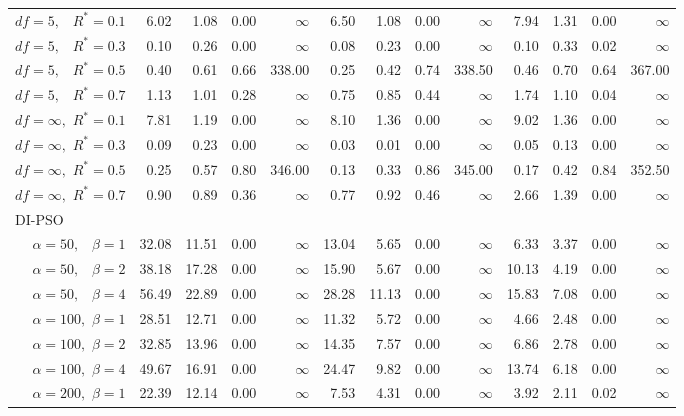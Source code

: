 \documentclass[12pt]{article}
\begin{document}
\begin{table}[ht]
{\begin{tabular}{r|rrrr|rrrr|rrrr}
  $df = 5,\enspace$ $R^* =0.1$ & 6.02 & 1.08 & 0.00 & $\infty$ & 6.50 & 1.08 & 0.00 & $\infty$ & 7.94 & 1.31 & 0.00 & $\infty$ \\ 
  $df = 5,\enspace$ $R^* =0.3$ & 0.10 & 0.26 & 0.00 & $\infty$ & 0.08 & 0.23 & 0.00 & $\infty$ & 0.10 & 0.33 & 0.02 & $\infty$ \\ 
  $df = 5,\enspace$ $R^* =0.5$ & 0.40 & 0.61 & 0.66 & 338.00 & 0.25 & 0.42 & 0.74 & 338.50 & 0.46 & 0.70 & 0.64 & 367.00 \\ 
  $df = 5,\enspace$ $R^* =0.7$ & 1.13 & 1.01 & 0.28 & $\infty$ & 0.75 & 0.85 & 0.44 & $\infty$ & 1.74 & 1.10 & 0.04 & $\infty$ \\ 
  $df = \infty,$ $R^* =0.1$ & 7.81 & 1.19 & 0.00 & $\infty$ & 8.10 & 1.36 & 0.00 & $\infty$ & 9.02 & 1.36 & 0.00 & $\infty$ \\ 
  $df = \infty,$ $R^* =0.3$ & 0.09 & 0.23 & 0.00 & $\infty$ & 0.03 & 0.01 & 0.00 & $\infty$ & 0.05 & 0.13 & 0.00 & $\infty$ \\ 
  $df = \infty,$ $R^* =0.5$ & 0.25 & 0.57 & 0.80 & 346.00 & 0.13 & 0.33 & 0.86 & 345.00 & 0.17 & 0.42 & 0.84 & 352.50 \\ 
  $df = \infty,$ $R^* =0.7$ & 0.90 & 0.89 & 0.36 & $\infty$ & 0.77 & 0.92 & 0.46 & $\infty$ & 2.66 & 1.39 & 0.00 & $\infty$ \\ 
\hline
\multicolumn{1}{l|}{DI-PSO} &&&&&&&&&&&&\\
  $\alpha = 50,\enspace$ $\beta =1$ & 32.08 & 11.51 & 0.00 & $\infty$ & 13.04 & 5.65 & 0.00 & $\infty$ & 6.33 & 3.37 & 0.00 & $\infty$ \\ 
  $\alpha = 50,\enspace$ $\beta =2$ & 38.18 & 17.28 & 0.00 & $\infty$ & 15.90 & 5.67 & 0.00 & $\infty$ & 10.13 & 4.19 & 0.00 & $\infty$ \\ 
  $\alpha = 50,\enspace$ $\beta =4$ & 56.49 & 22.89 & 0.00 & $\infty$ & 28.28 & 11.13 & 0.00 & $\infty$ & 15.83 & 7.08 & 0.00 & $\infty$ \\ 
  $\alpha = 100,$ $\beta =1$ & 28.51 & 12.71 & 0.00 & $\infty$ & 11.32 & 5.72 & 0.00 & $\infty$ & 4.66 & 2.48 & 0.00 & $\infty$ \\ 
  $\alpha = 100,$ $\beta =2$ & 32.85 & 13.96 & 0.00 & $\infty$ & 14.35 & 7.57 & 0.00 & $\infty$ & 6.86 & 2.78 & 0.00 & $\infty$ \\ 
  $\alpha = 100,$ $\beta =4$ & 49.67 & 16.91 & 0.00 & $\infty$ & 24.47 & 9.82 & 0.00 & $\infty$ & 13.74 & 6.18 & 0.00 & $\infty$ \\ 
  $\alpha = 200,$ $\beta =1$ & 22.39 & 12.14 & 0.00 & $\infty$ & 7.53 & 4.31 & 0.00 & $\infty$ & 3.92 & 2.11 & 0.02 & $\infty$ \\ 

\end{tabular}}
\end{table}
\end{document}
